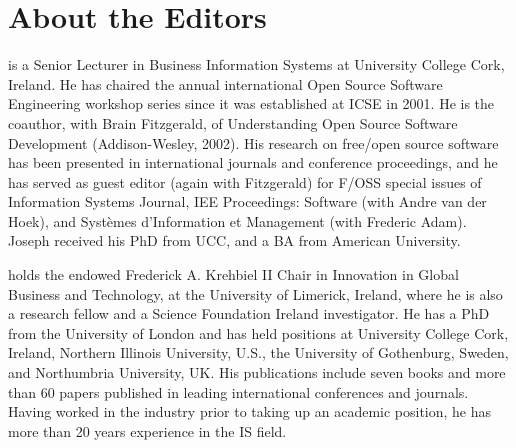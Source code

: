 \documentclass{mitpress}
\begin{document}







\listofcontributors

\section*{About the Editors}


 is a Senior Lecturer in Business Information Systems
at University College Cork, Ireland. He has chaired the annual international
Open Source Software Engineering workshop series since it was established at
ICSE in 2001. He is the coauthor, with Brain Fitzgerald, of Understanding
Open Source Software Development (Addison-Wesley, 2002). His research on
free/open source software has been presented in international journals and
conference proceedings, and he has served as guest editor (again with
Fitzgerald) for F/OSS special issues of Information Systems Journal, IEE
Proceedings: Software (with Andre van der Hoek), and Syst\`emes
d'Information et Management (with Frederic Adam). Joseph received his PhD
from UCC, and a BA from American University.

 holds the endowed Frederick A. Krehbiel II Chair in
Innovation in Global Business and Technology, at the University of
Limerick, Ireland, where he is also a research fellow and a Science Foundation
Ireland investigator. He has a PhD from the University of London and
has held positions at University College Cork, Ireland, Northern Illinois
University, U.S., the University of Gothenburg, Sweden, and Northumbria
University, UK. His publications include seven books and more than 60
papers published in leading international conferences and journals. Having
worked in the industry prior to taking up an academic position, he has
more than 20 years experience in the IS field.
\end{document}
